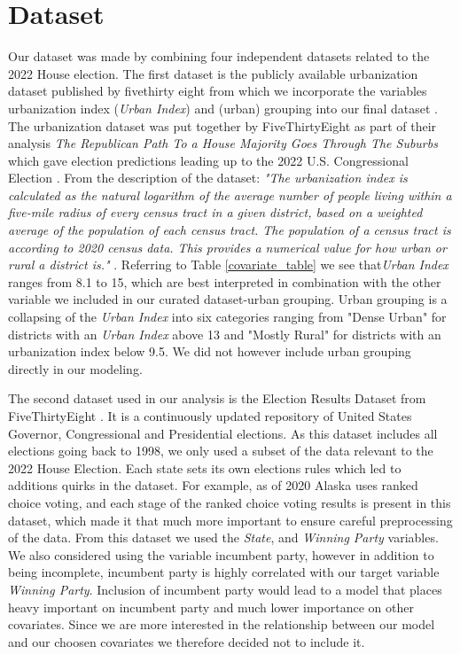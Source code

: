 \documentclass[12pt]{article}
\begin{document}
\section{Dataset}
Our dataset was made by combining four independent datasets related to the 2022 House election. The first dataset is the publicly available urbanization dataset published by fivethirty eight from which we incorporate the variables urbanization index (\textit{Urban Index}) and (urban) grouping into our final dataset \parencite{urbanizationdataset}. The urbanization dataset was put together by FiveThirtyEight as part of their analysis  \textit{The Republican Path To a House Majority Goes Through The Suburbs} which gave election predictions leading up to the 2022 U.S. Congressional Election \parencite{538urbanizationarticle}. From the description of the dataset: \textit{"The urbanization index is calculated as the natural logarithm of the average number of people living within a five-mile radius of every census tract in a given district, based on a weighted average of the population of each census tract. The population of a census tract is according to 2020 census data. This provides a numerical value for how urban or rural a district is."} \parencite{urbanizationdataset}. Referring to Table \ref{covariate_table} we see that\textit{Urban Index} ranges from 8.1 to 15, which are best interpreted in combination with the other variable we included in our curated dataset-urban grouping. Urban grouping is a collapsing of the \textit{Urban Index} into six categories ranging from "Dense Urban" for districts with an \textit{Urban Index} above 13 and "Mostly Rural" for districts with an urbanization index below 9.5. We did not however include urban grouping directly in our modeling.


The second dataset used in our analysis is the Election Results Dataset from FiveThirtyEight \parencite{electionresultsdataset}. It is a continuously updated repository of United States Governor, Congressional and Presidential elections. 
As this dataset includes all elections going back to 1998, we only used a subset of the data relevant to the 2022 House Election. Each state sets its own elections rules which led to additions quirks in the dataset. For example, as of 2020 Alaska uses ranked choice voting, and each stage of the ranked choice voting results is present in this dataset, which made it that much more important to ensure careful preprocessing of the data. From this dataset we used the \textit{State}, and \textit{Winning Party} variables. 
We also considered using the variable incumbent party, however in addition to being incomplete, incumbent party is highly correlated with our target variable \textit{Winning Party}. Inclusion of incumbent party would lead to a model that places heavy important on incumbent party and much lower importance on other covariates. Since we are more interested in the relationship between our model and our choosen covariates we therefore decided not to include it.  
 
\end{document}
